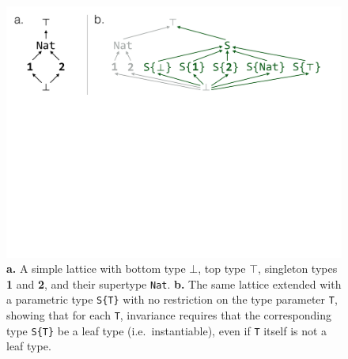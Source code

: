 \documentclass[10pt, preprint]{sigplanconf}
\begin{document}
\begin{figure}
	\centering
	\includegraphics[width=\columnwidth]{fig-lattice}
	\caption{
		\textbf{a.} A simple lattice with bottom type $\bot$, top type
		$\top$, singleton types \textbf{1} and \textbf{2}, and their
		supertype \texttt{Nat}.
		\textbf{b.} The same lattice extended with a parametric type
		\texttt{S\{T\}} with no restriction on the type parameter
		\texttt{T}, showing that for each \texttt{T}, invariance
		requires that the corresponding type \texttt{S\{T\}} be a leaf
		type (i.e.\ instantiable), even if \texttt{T} itself is not a
		leaf type.}
	\label{fig:lattice}
\end{figure}

\end{document}
